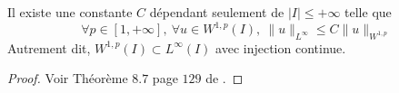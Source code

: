\begin{theorem}\label{thm_injec_W_Linfini}
    Il existe une constante $C$ dépendant seulement de $|I|\leq +\infty$ telle que 
    \begin{equation*}
        \forall p \in [1,+\infty], \ \forall u \in W^{1,p}(I), \ \|u\|_{L^\infty} \leq C\|u\|_{W^{1,p}}
    \end{equation*}
    Autrement dit, $W^{1,p}(I) \subset L^\infty(I)$ avec injection continue.
\end{theorem}

\begin{proof}
    Voir Théorème $8.7$ page $129$ de \cite{Brezis1987}.
\end{proof}